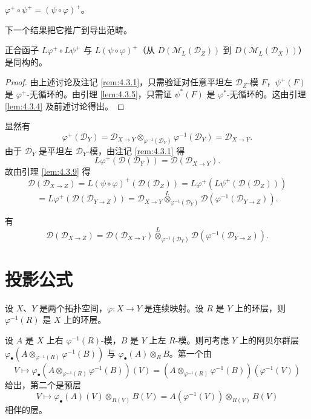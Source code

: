 \begin{lemma}\label{lem:4.3.9}
$\varphi^+\circ\psi^+=(\psi\circ\varphi)^+$。
\end{lemma}

下一个结果把它推广到导出范畴。

\begin{theorem}\label{thm:4.3.10}
正合函子 $L\varphi^+\circ L\psi^+$ 与 $L(\psi\circ\varphi)^+$（从 $D(\mathcal{M}_L(\mathcal{D}_Z))$ 到
$D(\mathcal{M}_L(\mathcal{D}_X))$）是同构的。
\end{theorem}

\begin{proof}
由上述讨论及注记 \ref{rem:4.3.1}，只需验证对任意平坦左 $\mathcal{D}_Z$-模 $F$，$\psi^+(F)$ 是 $\varphi^+$-无循环的。由引理 \ref{lem:4.3.5}，只需证 $\psi^*(F)$ 是 $\varphi^*$-无循环的。这由引理 \ref{lem:4.3.4} 及前述讨论得出。
\end{proof}

显然有
$$\varphi^+(\mathcal{D}_Y)=\mathcal{D}_{X\to Y}\otimes_{\varphi^{-1}(\mathcal{D}_Y)}\varphi^{-1}(\mathcal{D}_Y)=\mathcal{D}_{X\to Y}.$$
由于 $\mathcal{D}_Y$ 是平坦左 $\mathcal{D}_Y$-模，由注记 \ref{rem:4.3.1} 得
$$L\varphi^+(\mathcal{D}(\mathcal{D}_Y))=\mathcal{D}(\mathcal{D}_{X\to Y}).$$
故由引理 \ref{lem:4.3.9} 得
$$\mathcal{D}(\mathcal{D}_{X\to Z})=L(\psi\circ\varphi)^+(\mathcal{D}(\mathcal{D}_Z))
=L\varphi^+(L\psi^+(\mathcal{D}(\mathcal{D}_Z)))$$
$$=L\varphi^+(\mathcal{D}(\mathcal{D}_{Y\to Z}))
=\mathcal{D}_{X\to Y}\overset{L}{\otimes}_{\varphi^{-1}(\mathcal{D}_Y)}\mathcal{D}(\varphi^{-1}(\mathcal{D}_{Y\to Z})).$$

\begin{corollary}\label{cor:4.3.11}
有
$$\mathcal{D}(\mathcal{D}_{X\to Z})=\mathcal{D}(\mathcal{D}_{X\to Y})
\overset{L}{\otimes}_{\varphi^{-1}(\mathcal{D}_Y)}\mathcal{D}(\varphi^{-1}(\mathcal{D}_{Y\to Z})).$$
\end{corollary}

\section{投影公式}

设 $X$、$Y$ 是两个拓扑空间，$\varphi:X\to Y$ 是连续映射。设 $R$ 是 $Y$ 上的环层，则 $\varphi^{-1}(R)$ 是 $X$ 上的环层。

设 $A$ 是 $X$ 上右 $\varphi^{-1}(R)$-模，$B$ 是 $Y$ 上左 $R$-模。则可考虑 $Y$ 上的阿贝尔群层
$\varphi_\bullet(A\otimes_{\varphi^{-1}(R)}\varphi^{-1}(B))$ 与 $\varphi_\bullet(A)\otimes_R B$。第一个由
$$V\longmapsto\varphi_\bullet(A\otimes_{\varphi^{-1}(R)}\varphi^{-1}(B))(V)
=(A\otimes_{\varphi^{-1}(R)}\varphi^{-1}(B))(\varphi^{-1}(V))$$
给出，第二个是预层
$$V\longmapsto\varphi_\bullet(A)(V)\otimes_{R(V)}B(V)=A(\varphi^{-1}(V))\otimes_{R(V)}B(V)$$
相伴的层。

